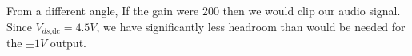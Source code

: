 \documentclass[11pt]{article}
\begin{document}
	From a different angle, If the gain were 200 then we would clip our audio signal. Since $V_{ds\text{,dc}} = 4.5V$, we have significantly less headroom than would be needed for the $\pm 1V$ output.
		
		
	\FloatBarrier
	\newpage
	\setcounter{tocdepth}{2}
	\begin{spacing}{0.1}
		\tableofcontents
		\listoffigures
	\end{spacing}
\end{document}
